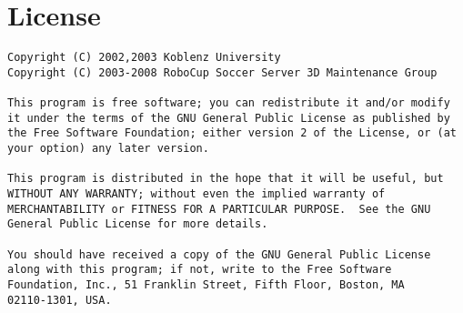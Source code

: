 \appendix
\chapter{License}

\begin{verbatim}
Copyright (C) 2002,2003 Koblenz University
Copyright (C) 2003-2008 RoboCup Soccer Server 3D Maintenance Group

This program is free software; you can redistribute it and/or modify
it under the terms of the GNU General Public License as published by
the Free Software Foundation; either version 2 of the License, or (at
your option) any later version.

This program is distributed in the hope that it will be useful, but
WITHOUT ANY WARRANTY; without even the implied warranty of
MERCHANTABILITY or FITNESS FOR A PARTICULAR PURPOSE.  See the GNU
General Public License for more details.

You should have received a copy of the GNU General Public License
along with this program; if not, write to the Free Software
Foundation, Inc., 51 Franklin Street, Fifth Floor, Boston, MA
02110-1301, USA.

\end{verbatim}


